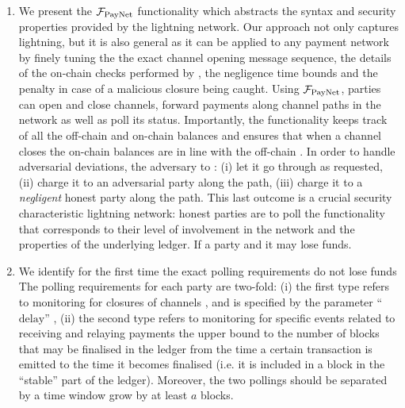 \begin{enumerate}
\item We present the $\mathcal{F}_{\mathrm{PayNet}}{}$ functionality which abstracts the syntax and
security properties provided by the lightning network.  Our approach not only captures lightning,
but it is also general as it can be applied to any payment network by finely
tuning the  the exact channel
opening message sequence, the details of the on-chain checks performed by
\fpaynet, the negligence time bounds and the penalty in case of a malicious
closure being caught. Using $\mathcal{F}_{\mathrm{PayNet}}{}$, parties can open and close channels,
forward payments along channel paths in the network as well as poll its status.
Importantly, the functionality keeps track of all the off-chain and on-chain
balances and ensures that when a channel closes\redden{,} the on-chain balances
are in line with the off-chain . In order to handle
 adversarial deviations,  the
adversary to : (i) let it go through as requested, (ii) charge it to an adversarial
party along the path, (iii) charge it to a \emph{negligent} honest party along
the path. This last outcome is a crucial security characteristic 
lightning network: honest parties are  to poll the
functionality  that corresponds to their level of
involvement in the network and the properties of the underlying ledger. If a
party  and it may lose funds.

\item We identify for the first time the exact polling requirements  do not lose funds The polling requirements for each party are two-fold: (i) the
first type refers to monitoring for closures of channels , and is specified by the parameter ``$\mathrm{delay}$''
, (ii) the second type refers to monitoring for
specific events related to receiving and relaying payments the upper bound
to the number of blocks that may be finalised in the ledger from the time a
certain transaction is emitted to the time it becomes finalised (i.e. it is
included in a block in the ``stable'' part of the ledger).  Moreover, the two pollings should be
separated by a time window  grow by at least $a$
blocks.


\end{enumerate}

